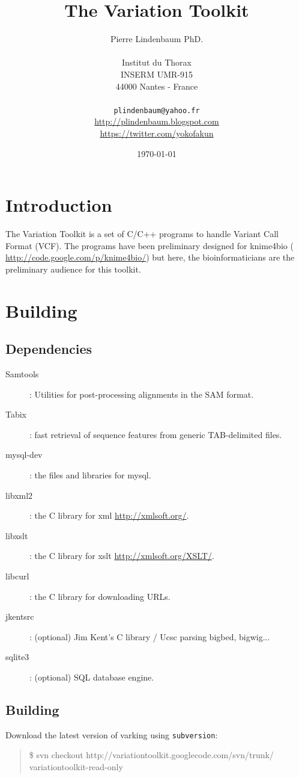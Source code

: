 \documentclass[12pt]{article}
\title{The Variation Toolkit}
\author{Pierre Lindenbaum PhD.
\\
\\Institut du Thorax\\INSERM UMR-915\\44000 Nantes - France\\
\\
\texttt{plindenbaum@yahoo.fr}\\ \url{http://plindenbaum.blogspot.com}\\ \url{https://twitter.com/yokofakun}
\\
}
\date{\today}
\begin{document}
\maketitle

\cleardoublepage
\section{Introduction}
The Variation Toolkit is a set of C/C++ programs to handle Variant Call Format (VCF).
The programs have been preliminary designed for knime4bio ( \url{http://code.google.com/p/knime4bio/}) \cite{pmid21984761}
but here, the bioinformaticians are the preliminary audience for this toolkit.
\section{Building}
\subsection{Dependencies}
\begin{description}
\item[Samtools]: Utilities for post-processing alignments in the SAM format. \cite{pmid19505943}
\item[Tabix]: fast retrieval of sequence features from generic TAB-delimited files. \cite{pmid21208982}
\item[mysql-dev]: the files and libraries for mysql.
\item[libxml2]: the C library for xml \url{http://xmlsoft.org/}.
\item[libxslt]: the C library for xslt \url{http://xmlsoft.org/XSLT/}.
\item[libcurl]: the C library for downloading URLs.
\item[jkentsrc]: (optional) Jim Kent's C library / Ucsc parsing bigbed, bigwig...
\item[sqlite3]: (optional) SQL database engine.
\end{description}
\subsection{Building}
Download the latest version of varking using \texttt{subversion}:

\begin{quote}
\$ svn checkout http://variationtoolkit.googlecode.com/svn/trunk/ variationtoolkit-read-only
\end{quote}
\end{document}
